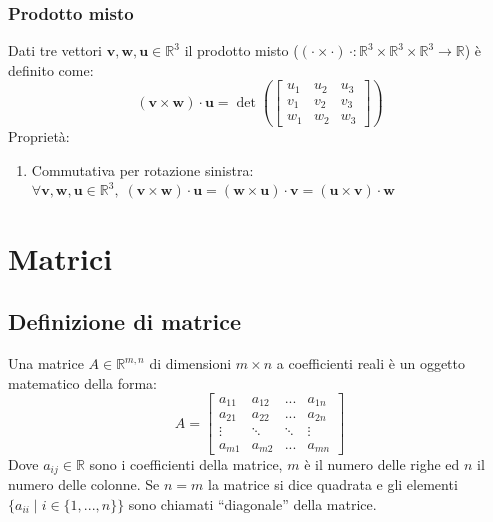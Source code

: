 \documentclass{article}
\begin{document}
    \subsubsection{Prodotto misto} \label{subsubsec:vsmisc}
        Dati tre vettori $\mathbf{v}, \mathbf{w}, \mathbf{u} \in \mathbb{R}^3$ il prodotto misto ($(\cdot \times \cdot) \, \cdot : \mathbb{R}^3 \times \mathbb{R}^3 \times \mathbb{R}^3 \rightarrow \mathbb{R}$) è definito come:
        \[
            (\mathbf{v} \times \mathbf{w}) \cdot \mathbf{u} = \det \left( 
            \begin{bmatrix}
                u_1 & u_2 & u_3 \\
                v_1 & v_2 & v_3 \\
                w_1 & w_2 & w_3
            \end{bmatrix}
            \right)
        \]
        Proprietà: 
        \begin{enumerate}[label=(\arabic*)]
            \item Commutativa per rotazione sinistra: $\forall \mathbf{v}, \mathbf{w}, \mathbf{u} \in \mathbb{R}^3, \; (\mathbf{v} \times \mathbf{w}) \cdot \mathbf{u} = (\mathbf{w} \times \mathbf{u}) \cdot \mathbf{v} = (\mathbf{u} \times \mathbf{v}) \cdot \mathbf{w}$  
        \end{enumerate}






\newpage
\section{Matrici} \label{sec:matrices}
\subsection{Definizione di matrice} \label{subsec:matdefinition}
    Una matrice $A \in \mathbb{R}^{m, n}$ di dimensioni $m \times n$ a coefficienti reali è un oggetto matematico della forma:
    \[  A =
        \begin{bmatrix}
            a_{11} & a_{12} & ... & a_{1n} \\
            a_{21} & a_{22} & ... & a_{2n} \\
            \vdots & \ddots & \ddots & \vdots \\
            a_{m1} & a_{m2} & ... & a_{mn} 
        \end{bmatrix}
    \]
    Dove $a_{ij} \in \mathbb{R}$ sono i coefficienti della matrice, $m$ è il numero delle righe ed $n$ il numero delle colonne.
    Se $n = m$ la matrice si dice quadrata e gli elementi $\{ a_{ii} \; | \; i \in \{1, ..., n\}\}$ sono chiamati ``diagonale'' della matrice. 
\end{document}
